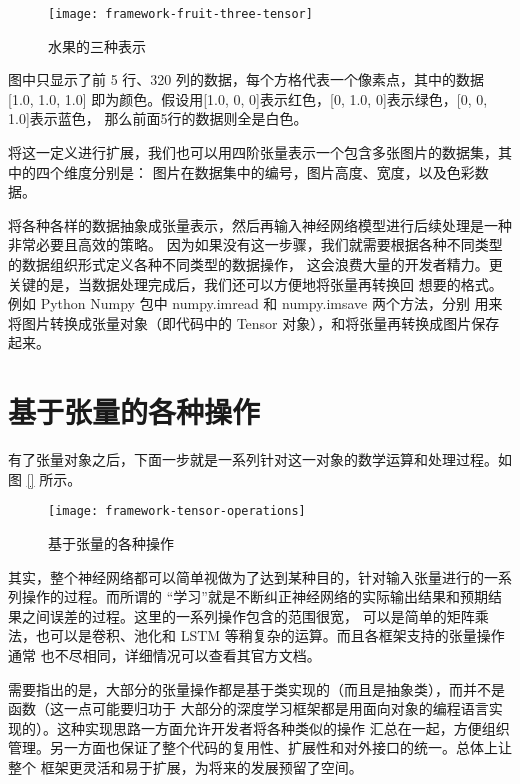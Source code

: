 \begin{figure}[hbtp]
\centering
\texttt{[image: framework-fruit-three-tensor]}
\caption{水果的三种表示}
\label{fig:framework-fruit-three-tensor}
\end{figure}

图中只显示了前 5 行、320 列的数据，每个方格代表一个像素点，其中的数据 [1.0, 1.0, 1.0]
即为颜色。假设用[1.0, 0, 0]表示红色，[0, 1.0, 0]表示绿色，[0, 0, 1.0]表示蓝色，
那么前面5行的数据则全是白色。

将这一定义进行扩展，我们也可以用四阶张量表示一个包含多张图片的数据集，其中的四个维度分别是：
图片在数据集中的编号，图片高度、宽度，以及色彩数据。

将各种各样的数据抽象成张量表示，然后再输入神经网络模型进行后续处理是一种非常必要且高效的策略。
因为如果没有这一步骤，我们就需要根据各种不同类型的数据组织形式定义各种不同类型的数据操作，
这会浪费大量的开发者精力。更关键的是，当数据处理完成后，我们还可以方便地将张量再转换回
想要的格式。例如 Python Numpy 包中 numpy.imread 和 numpy.imsave 两个方法，分别
用来将图片转换成张量对象（即代码中的 Tensor 对象），和将张量再转换成图片保存起来。


\section{基于张量的各种操作}\label{sec:tensor-operations}

有了张量对象之后，下面一步就是一系列针对这一对象的数学运算和处理过程。如图 \ref{} 所示。

\begin{figure}[hbtp]
\centering
\texttt{[image: framework-tensor-operations]}
\caption{基于张量的各种操作}
\label{fig:framework-tensor-operations}
\end{figure}

其实，整个神经网络都可以简单视做为了达到某种目的，针对输入张量进行的一系列操作的过程。而所谓的
“学习”就是不断纠正神经网络的实际输出结果和预期结果之间误差的过程。这里的一系列操作包含的范围很宽，
可以是简单的矩阵乘法，也可以是卷积、池化和 LSTM 等稍复杂的运算。而且各框架支持的张量操作通常
也不尽相同，详细情况可以查看其官方文档。

需要指出的是，大部分的张量操作都是基于类实现的（而且是抽象类），而并不是函数（这一点可能要归功于
大部分的深度学习框架都是用面向对象的编程语言实现的）。这种实现思路一方面允许开发者将各种类似的操作
汇总在一起，方便组织管理。另一方面也保证了整个代码的复用性、扩展性和对外接口的统一。总体上让整个
框架更灵活和易于扩展，为将来的发展预留了空间。


